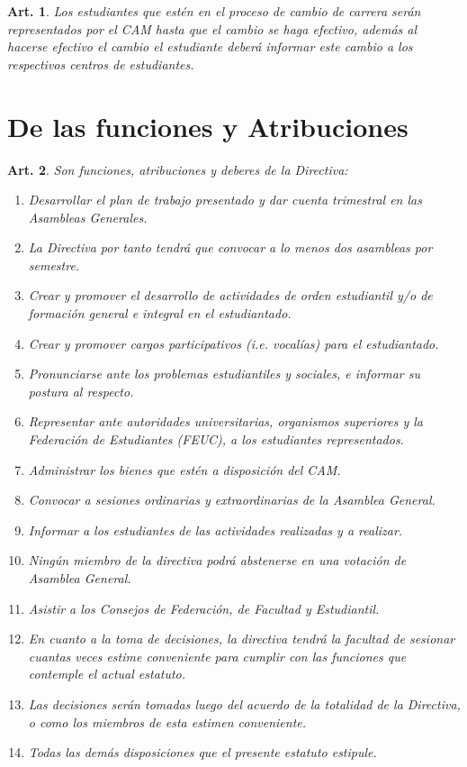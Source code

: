 \documentclass[letterpaper,11pt]{article}
\theoremstyle{plain}
\newtheorem{art}{Art.} %
\begin{document}
\begin{art}
	Los estudiantes que estén en el proceso de cambio de carrera serán representados por el CAM hasta que el cambio se haga efectivo, además al hacerse efectivo el cambio el estudiante deberá informar este cambio a los respectivos centros de estudiantes.
\end{art}

\section{De las funciones y Atribuciones}\label{funcionesAtribuciones}
\begin{art}\label{funcionesDirectiva}
	Son funciones, atribuciones y deberes de la Directiva:
	\begin{enumerate}
		\item Desarrollar el plan de trabajo presentado y dar cuenta trimestral en las Asambleas Generales.
		\item La Directiva por tanto tendrá que convocar a lo menos dos asambleas por semestre.
		\item Crear y promover el desarrollo de actividades de orden estudiantil y/o de formación general e integral en el estudiantado.
		\item Crear y promover cargos participativos (i.e. vocalías) para el estudiantado.%
		\item Pronunciarse ante los problemas estudiantiles y sociales, e informar su postura al respecto.
		\item Representar ante autoridades universitarias, organismos superiores y la Federación de Estudiantes (FEUC), a los estudiantes representados.
		\item Administrar los bienes que estén a disposición del CAM.
		\item Convocar a sesiones ordinarias y extraordinarias de la Asamblea General.
		\item Informar a los estudiantes de las actividades realizadas y a realizar.
		\item Ningún miembro de la directiva podrá abstenerse en una votación de Asamblea General.
		\item Asistir a los Consejos de Federación, de Facultad y Estudiantil.
		\item En cuanto a la toma de decisiones, la directiva tendrá la facultad de sesionar cuantas veces estime conveniente para cumplir con las funciones que contemple el actual estatuto.
		\item Las decisiones serán tomadas  luego del acuerdo de la totalidad de la Directiva, o como los miembros de esta estimen conveniente.
		\item Todas las demás disposiciones que el presente estatuto estipule.
	\end{enumerate}
\end{art}
\end{document}
